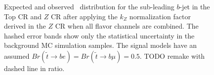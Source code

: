 \begin{figure}
  \centering
  \caption{Expected and observed \pt\ distribution for the sub-leading $b$-jet
    in the Top CR and $Z$ CR after applying the $k_Z$ normalization factor
    derived in the $Z$ CR when all flavor channels are combined.
    The hashed error bands show only the statistical uncertainty in the
    background MC simulation samples.
    The signal models have an assumed
    $Br(\tilde{t}\rightarrow be) = Br(\tilde{t}\rightarrow b\mu) = 0.5$.
    {\color{red} TODO remake with dashed line in ratio.}
  }
  \label{fig:cr_b_jet_pt_1__w_norm_factor}
\end{figure}

